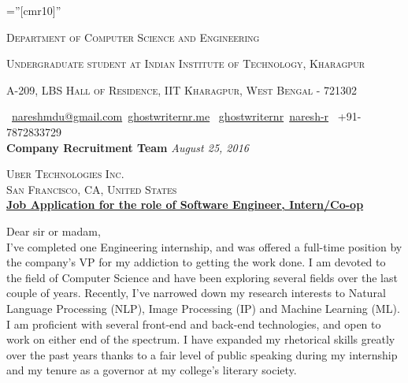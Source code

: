 \documentclass[a4paper,10pt]{extarticle} %
\begin{document}
\pagestyle{empty} %

\font\fb=''[cmr10]'' %


\par{\par} %
\par{\centering\large {\textsc{Department of Computer Science and Engineering}}\par}\large
\par{\centering\large {\textsc{Undergraduate student at Indian Institute of Technology, Kharagpur}}\par}\large
\par{\centering\large {\textsc{A-209, LBS Hall of Residence, IIT Kharagpur, West Bengal - 721302}}\par}\large
\hspace{0.5cm}\normalsize \faEnvelope\ {\href{mailto:nareshmdu@gmail.com}{nareshmdu@gmail.com}}\hfill \normalsize  \faGlobe\ {\href{http://ghostwriternr.me/}{ghostwriternr.me}} \hfill \normalsize \faGithub\ {\href{https://github.com/ghostwriternr}{ghostwriternr}}\hfill \normalsize  \faLinkedinSquare\ {\href{https://www.linkedin.com/in/naresh-r-464a8b8b}{naresh-r}} \hfill {\faPhone\ +91-7872833729} \hspace{0.5cm} \\[10pt]

\textbf{\large{Company Recruitment Team}} \hfill \textit{August 25, 2016}

\textsc{Uber Technologies Inc.} \\
\textsc{San Francisco, CA, United States}\\

\underline{\textbf{Job Application for the role of Software Engineer, Intern/Co-op}}

Dear sir or madam,\\

I’ve completed one Engineering internship, and was offered a full-time position by the company’s VP for my addiction to getting the work done. I am devoted to the ﬁeld of Computer Science and have been exploring several ﬁelds over the last couple of years. Recently, I’ve narrowed down my research interests to Natural Language Processing (NLP), Image Processing (IP) and Machine Learning (ML). I am proﬁcient with several front-end and back-end technologies, and open to work on either end of the spectrum. I have expanded my rhetorical skills greatly over the past years thanks to a fair level of public speaking during my internship and my tenure as a governor at my college’s literary society. \\
\end{document}
